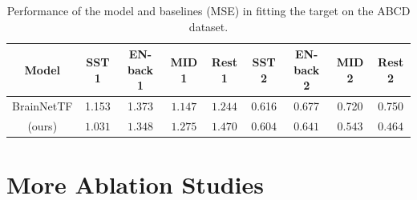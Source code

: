 \begin{table}[H]
    \centering
    \begin{tabular}{c|cccccccc}
    \toprule
Model &	SST 1 &	EN-back 1 &	MID 1 &	Rest 1 &	SST 2 &	EN-back 2 &	MID 2 &	Rest 2 \\
\midrule

BrainNetTF & 1.153 & 1.373 & $\mathbf{1.147}$ & $\mathbf{1.244}$ & 0.616 & 0.677 & 0.720 & 0.750\\
\hybrid{} (ours) &  $\mathbf{1.031}$& 	 $\mathbf{1.348}$&  $1.275$& 	 $1.470$& 	 $\mathbf{0.604}$& 	 $\mathbf{0.641}$&  $\mathbf{0.543}$& 	 $\mathbf{0.464}$ \\
\bottomrule
    \end{tabular}
    \caption{Performance of the model and baselines (MSE) in fitting the target on the ABCD dataset.}
    \label{tab:fit_abcd}
\end{table}


\section{More Ablation Studies}
\label{app:ablation}


